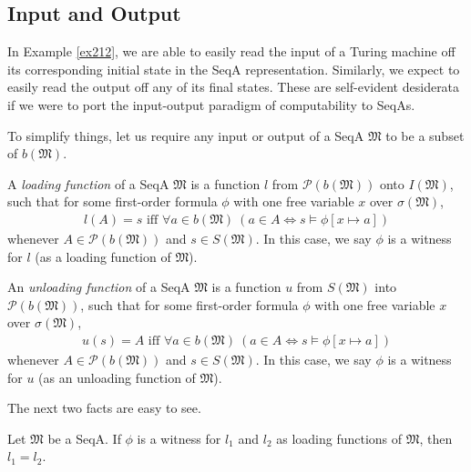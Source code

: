 \documentclass[12pt]{article}
\numberwithin{equation}{section}
\begin{document}
\subsection{Input and Output}

In Example \ref{ex212}, we are able to easily read the input of a Turing machine off its corresponding initial state in the SeqA representation. Similarly, we expect to easily read the output off any of its final states. These are self-evident desiderata if we were to port the input-output paradigm of computability to SeqAs. 

To simplify things, let us require any input or output of a SeqA $\mathfrak{M}$ to be a subset of $b(\mathfrak{M})$.

\begin{defi}
A \emph{loading function} of a SeqA $\mathfrak{M}$ is a function $l$ from $\mathcal{P}(b(\mathfrak{M}))$ onto $I(\mathfrak{M})$, such that for some first-order formula $\phi$ with one free variable $x$ over $\sigma(\mathfrak{M})$,
\begin{align*}
    l(A) = s \text{ iff } \forall a \in b(\mathfrak{M}) \ (a \in A \iff s \models \phi[x \mapsto a])
\end{align*}
whenever $A \in \mathcal{P}(b(\mathfrak{M}))$ and $s \in S(\mathfrak{M})$. In this case, we say $\phi$ is a witness for $l$ (as a loading function of $\mathfrak{M}$).
\end{defi}

\begin{defi}
An \emph{unloading function} of a SeqA $\mathfrak{M}$ is a function $u$ from $S(\mathfrak{M})$ into $\mathcal{P}(b(\mathfrak{M}))$, such that for some first-order formula $\phi$ with one free variable $x$ over $\sigma(\mathfrak{M})$,
\begin{align*}
    u(s) = A \text{ iff } \forall a \in b(\mathfrak{M}) \ (a \in A \iff s \models \phi[x \mapsto a])
\end{align*}
whenever $A \in \mathcal{P}(b(\mathfrak{M}))$ and $s \in S(\mathfrak{M})$. In this case, we say $\phi$ is a witness for $u$ (as an unloading function of $\mathfrak{M}$).
\end{defi}

The next two facts are easy to see.

\begin{fact}\label{fact215}
Let $\mathfrak{M}$ be a SeqA. If $\phi$ is a witness for $l_1$ and $l_2$ as loading functions of $\mathfrak{M}$, then $l_1 = l_2$.
\end{fact}
\end{document}
